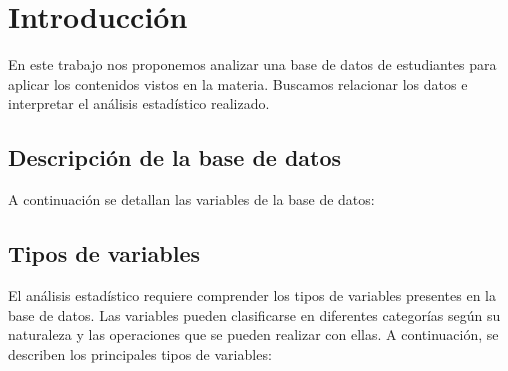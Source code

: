 \section{Introducción}

En este trabajo nos proponemos analizar una base de datos de estudiantes para aplicar los contenidos
vistos en la materia. Buscamos relacionar los datos e interpretar el análisis estadístico realizado.

\subsection{Descripción de la base de datos}
A continuación se detallan las variables de la base de datos:



\subsection{Tipos de variables}
El análisis estadístico requiere comprender los tipos de variables presentes en la base de datos.
Las variables pueden clasificarse en diferentes categorías según su naturaleza y las operaciones que
se pueden realizar con ellas. A continuación, se describen los principales tipos de variables:


